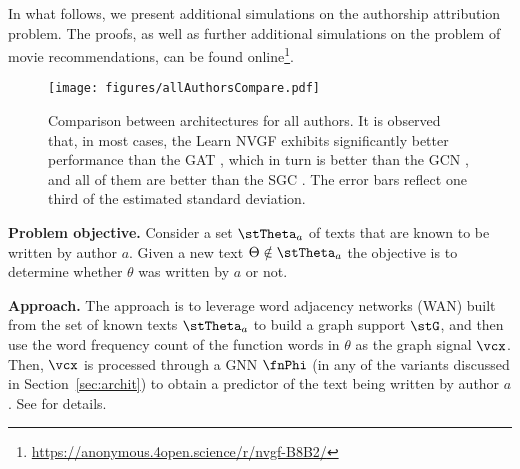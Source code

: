 
In what follows, we present additional simulations on the authorship attribution problem. The proofs, as well as further additional simulations on the problem of movie recommendations, can be found online\footnote{\url{https://anonymous.4open.science/r/nvgf-B8B2/}}.


\begin{figure*}
    \centering
    \texttt{[image: figures/allAuthorsCompare.pdf]}
    \caption{Comparison between architectures for all authors. It is observed that, in most cases, the Learn NVGF exhibits significantly better performance than the GAT \cite{Velickovic2018-GAT}, which in turn is better than the GCN \cite{Kipf2017-GCN}, and all of them are better than the SGC \cite{Weinberger2019-SGC}. The error bars reflect one third of the estimated standard deviation.}
    \label{fig:app:allAuthors:compare}
\end{figure*}

\textbf{Problem objective.} Consider a set $\stTheta_{a}$ of texts that are known to be written by author $a$. Given a new text $\theta \notin \stTheta_{a}$ the objective is to determine whether $\theta$ was written by $a$ or not.

\textbf{Approach.} The approach is to leverage word adjacency networks (WAN) built from the set of known texts $\stTheta_{a}$ to build a graph support $\stG$, and then use the word frequency count of the function words in $\theta$ as the graph signal $\vcx$. Then, $\vcx$ is processed through a GNN $\fnPhi$ (in any of the variants discussed in Section~\ref{sec:archit}) to obtain a predictor of the text being written by author $a$. See \cite{Segarra2015-Authorship} for details.

